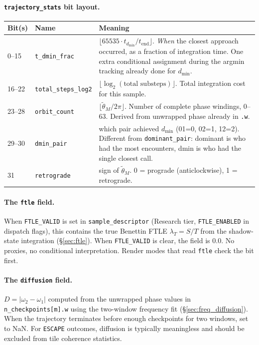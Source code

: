 \documentclass[11pt]{report}
\begin{document}
\paragraph{\texttt{trajectory\_stats} bit layout.}
\begin{center}
\begin{tabular}{llp{8.5cm}}
\toprule
Bit(s) & Name & Meaning \\
\midrule
0--15 & \texttt{t\_dmin\_frac} & $\lfloor 65535\cdot t_{d_{\min}}/t_{\mathrm{end}}\rfloor$. \emph{When} the closest approach occurred, as a fraction of integration time. One extra conditional assignment during the argmin tracking already done for $d_{\min}$. \\
16--22 & \texttt{total\_steps\_log2} & $\lfloor\log_2(\text{total substeps})\rfloor$. Total integration cost for this sample. \\
23--28 & \texttt{orbit\_count} & $\lfloor\tilde\theta_M/2\pi\rfloor$. Number of complete phase windings, 0--63. Derived from unwrapped phase already in \texttt{.w}. \\
29--30 & \texttt{dmin\_pair} & which pair achieved $d_{\min}$ (01=0, 02=1, 12=2). Different from \texttt{dominant\_pair}: dominant is who had the most encounters, dmin is who had the single closest call. \\
31 & \texttt{retrograde} & sign of $\tilde\theta_M$. 0 = prograde (anticlockwise), 1 = retrograde. \\
\bottomrule
\end{tabular}
\end{center}

\paragraph{The \texttt{ftle} field.} When \texttt{FTLE\_VALID} is set in \texttt{sample\_descriptor} (Research tier, \texttt{FTLE\_ENABLED} in dispatch flags), this contains the true Benettin FTLE $\lambda_T=S/T$ from the shadow-state integration (\S\ref{sec:ftle}). When \texttt{FTLE\_VALID} is clear, the field is 0.0. No proxies, no conditional interpretation. Render modes that read \texttt{ftle} check the bit first.

\paragraph{The \texttt{diffusion} field.} $D=|\omega_2-\omega_1|$ computed from the unwrapped phase values in \texttt{n\_checkpoints[m].w} using the two-window frequency fit (\S\ref{sec:freq_diffusion}). When the trajectory terminates before enough checkpoints for two windows, set to NaN. For \texttt{ESCAPE} outcomes, diffusion is typically meaningless and should be excluded from tile coherence statistics.
\end{document}

